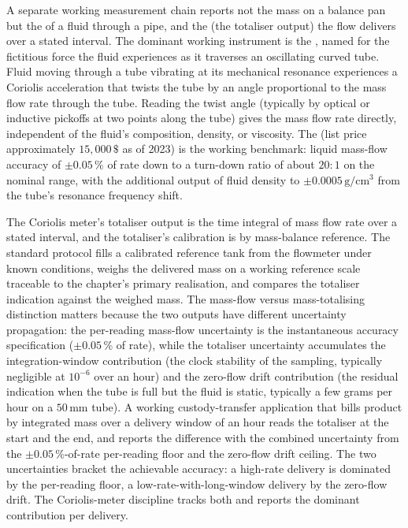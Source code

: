 A separate working measurement chain reports not the mass on a
balance pan but the  of a fluid through a
pipe, and the  (the totaliser output) the
flow delivers over a stated interval. The dominant working
instrument is the , named for the
fictitious force the fluid experiences as it traverses an
oscillating curved tube. Fluid moving through a tube vibrating at
its mechanical resonance experiences a Coriolis acceleration that
twists the tube by an angle proportional to the mass flow rate
through the tube. Reading the twist angle (typically by optical or
inductive pickoffs at two points along the tube) gives the mass
flow rate directly, independent of the fluid's composition, density,
or viscosity. The
 (list price approximately
$15{,}000 \,\$ $ as of 2023)
\cite{ch07t3b-web:emerson-cmf200} is the working benchmark: liquid
mass-flow accuracy of $\pm 0.05\,\%$ of rate down to a turn-down
ratio of about $20{:}1$ on the nominal range, with the additional
output of fluid density to $\pm 0.0005 \,\si{\gram\per\centi\meter
\cubed}$ from the tube's resonance frequency shift.

The Coriolis meter's totaliser output is the time integral of mass
flow rate over a stated interval, and the totaliser's calibration
is by mass-balance reference. The standard protocol fills a
calibrated reference tank from the flowmeter under known conditions,
weighs the delivered mass on a working reference scale traceable to
the chapter's primary realisation, and compares the totaliser
indication against the weighed mass. The mass-flow versus
mass-totalising distinction matters because the two outputs have
different uncertainty propagation: the per-reading mass-flow
uncertainty is the instantaneous accuracy specification
($\pm 0.05\,\%$ of rate), while the totaliser uncertainty accumulates
the integration-window contribution (the clock stability of the
sampling, typically negligible at $10^{-6}$ over an hour) and the
zero-flow drift contribution (the residual indication when the
tube is full but the fluid is static, typically a few grams per hour
on a $50 \,\si{\milli\meter}$ tube). A working custody-transfer
application that bills product by integrated mass over a delivery
window of an hour reads the totaliser at the start and the end, and
reports the difference with the combined uncertainty from the
$\pm 0.05\,\%$-of-rate per-reading floor and the zero-flow drift
ceiling. The two uncertainties bracket the achievable accuracy: a
high-rate delivery is dominated by the per-reading floor, a
low-rate-with-long-window delivery by the zero-flow drift. The
Coriolis-meter discipline tracks both and reports the dominant
contribution per delivery.

